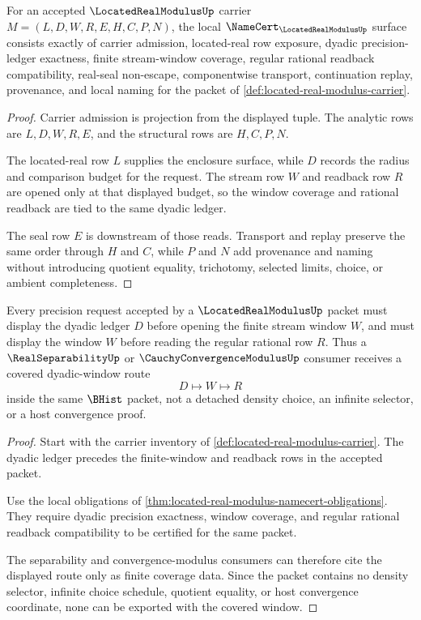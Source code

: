 \begin{theorem}
\label{thm:located-real-modulus-namecert-obligations}
For an accepted $\LocatedRealModulusUp$ carrier $M=(L,D,W,R,E,H,C,P,N)$, the local $\NameCert_{\LocatedRealModulusUp}$ surface consists exactly of carrier admission, located-real row exposure, dyadic precision-ledger exactness, finite stream-window coverage, regular rational readback compatibility, real-seal non-escape, componentwise transport, continuation replay, provenance, and local naming for the packet of \autoref{def:located-real-modulus-carrier}.
\end{theorem}
\begin{proof}
Carrier admission is projection from the displayed tuple. The analytic rows are $L,D,W,R,E$, and the structural rows are $H,C,P,N$.

The located-real row $L$ supplies the enclosure surface, while $D$ records the radius and comparison budget for the request. The stream row $W$ and readback row $R$ are opened only at that displayed budget, so the window coverage and rational readback are tied to the same dyadic ledger.

The seal row $E$ is downstream of those reads. Transport and replay preserve the same order through $H$ and $C$, while $P$ and $N$ add provenance and naming without introducing quotient equality, trichotomy, selected limits, choice, or ambient completeness.
\end{proof}

\begin{theorem}
\label{thm:located-real-modulus-dyadic-window-coverage}
Every precision request accepted by a $\LocatedRealModulusUp$ packet must display the dyadic ledger $D$ before opening the finite stream window $W$, and must display the window $W$ before reading the regular rational row $R$. Thus a $\RealSeparabilityUp$ or $\CauchyConvergenceModulusUp$ consumer receives a covered dyadic-window route
$$
D\longmapsto W\longmapsto R
$$
inside the same $\BHist$ packet, not a detached density choice, an infinite selector, or a host convergence proof.
\end{theorem}
\begin{proof}
Start with the carrier inventory of \autoref{def:located-real-modulus-carrier}. The dyadic ledger precedes the finite-window and readback rows in the accepted packet.

Use the local obligations of \autoref{thm:located-real-modulus-namecert-obligations}. They require dyadic precision exactness, window coverage, and regular rational readback compatibility to be certified for the same packet.

The separability and convergence-modulus consumers can therefore cite the displayed route only as finite coverage data. Since the packet contains no density selector, infinite choice schedule, quotient equality, or host convergence coordinate, none can be exported with the covered window.
\end{proof}

